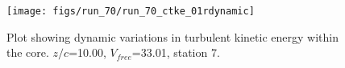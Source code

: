 \begin{figure}[H]
\centering
\texttt{[image: figs/run\_70/run\_70\_ctke\_01rdynamic]}
\caption{Plot showing dynamic variations in turbulent kinetic energy within the core. $z/c$=10.00, $V_{free}$=33.01, station 7.}
\end{figure}


